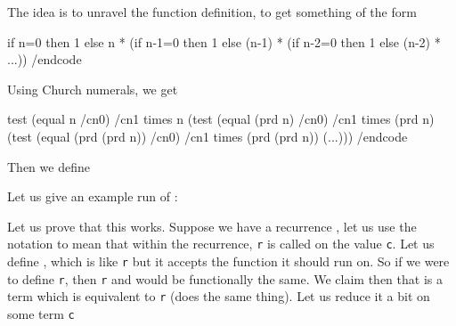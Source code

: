 The idea is to unravel the function definition, to get something of the form

\begincode
if n=0 then 1
else n * (if n-1=0 then 1
          else (n-1) * (if n-2=0 then 1
                        else (n-2) * ...))
/endcode

Using Church numerals, we get

\begincode
test (equal n /cn0) 
    /cn1
    times n (test (equal (prd n) /cn0)
            /cn1
            times (prd n) (test (equal (prd (prd n)) /cn0)
                           /cn1
                           times (prd (prd n)) (...)))
/endcode

Then we define


Let us give an example run of :

\medskip
{}

\def\recur#1{$\gen{\hbox{#1}}$}
Let us prove that this works.
Suppose we have a recurrence \lcalc{r=\lambda x.\recur{code with r}}, let us use the notation \lcalc{\recur{r c}} to mean that within the recurrence, {\tt r} is called on the value {\tt c}.
Let us define \lcalc{g=\lambda r.\lambda x.\recur{code with r}}, which is like {\tt r} but it accepts the function it should run on.
So if we were to define {\tt r}, then {\tt r} and  would be functionally the same.
We claim then that  is a term which is equivalent to {\tt r} (does the same thing).
Let us reduce it a bit on some term {\tt c}

\medskip
{}

